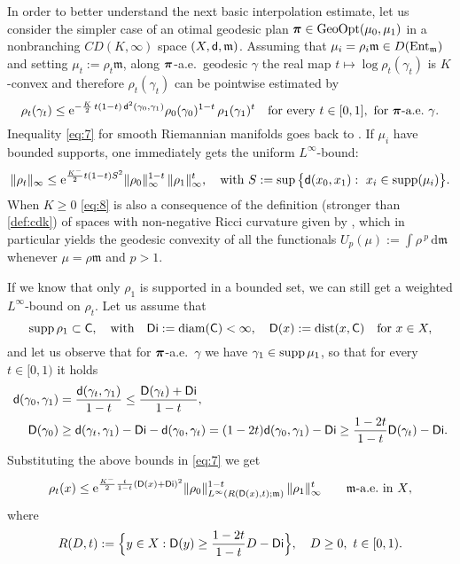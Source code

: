 \documentclass[reqno,11pt]{article}
\numberwithin{equation}{section}
\newcommand{\mm}{{\mbox{\boldmath$m$}}}
\newcommand{\ppi}{{\mbox{\boldmath$\pi$}}}
\newcommand{\sfd}{{\sf d}}
\newcommand{\sfC}{{\sf C}}
\newcommand{\sfD}{{\sf D}}
\newcommand{\rme}{{\mathrm e}}
\newcommand{\supp}{\mathop{\rm supp}\nolimits}   %
\newcommand{\diam}{\mathop{\rm diam}\nolimits}   %
\renewcommand{\d}{{\mathrm d}}
\newcommand{\forevery}{\text{for every }}
\newcommand{\entv}{{\rm Ent}_{\mm}}                    %
\newcommand{\gopt}{{\rm{GeoOpt}}}                   %
\newcommand{\Di}{\mathsf{Di}}
\renewcommand{\mm}{\mathfrak m}
\begin{document}
In order to better understand the next basic interpolation estimate,
let us consider the simpler case of an otimal geodesic plan $\ppi\in
\gopt(\mu_0,\mu_1)$ in a nonbranching $CD(K,\infty)$ space
$(X,\sfd,\mm)$. Assuming that $\mu_i=\rho_i\mm\in D(\entv)$ and
setting $\mu_t:=\rho_t\mm$, along $\ppi$-a.e.\ geodesic $\gamma$ the
real map $t\mapsto\log\rho_t(\gamma_t)$ is $K$-convex and therefore
$\rho_t(\gamma_t)$ can be pointwise estimated by \cite[Thm.~30.32,
(30.51)]{Villani09}
\begin{equation}
  \label{eq:7}
  \rho_t(\gamma_t)\le \rme^{-\frac
    K2\,t(1-t)\,\sfd^2(\gamma_0,\gamma_1)}\rho_0(\gamma_0)^{1-t}\,\rho_1(\gamma_1)^t\quad
  \forevery t\in [0,1],\ \text{for $\ppi$-a.e.\ $\gamma$.}
\end{equation}
Inequality \eqref{eq:7} for smooth Riemannian manifolds goes back to
\cite{Cordero-McCann-Schmuckenschlager01}. If $\mu_i$ have bounded
supports, one immediately gets the uniform $L^\infty$-bound:
\begin{equation}
  \label{eq:8}
  \|\rho_t\|_\infty
  \le \rme^{\frac {K^-}2    t(1-t)S^2}
  \|\rho_0\|_\infty
  ^{1-t}\,\|\rho_1\|_\infty^t,\quad\text{with }
  S:=\sup\big\{\sfd(x_0,x_1):\ x_i\in\supp(\mu_i)\big\}.
\end{equation}
When $K\ge0$ \eqref{eq:8} is also a consequence of the definition (stronger than
\eqref{def:cdk}) of spaces with
non-negative Ricci curvature given by \cite{Lott-Villani09}, which in
particular yields the geodesic convexity of all the
functionals $U_{p}(\mu):=\int \rho\,^p\,\d\mm$ whenever $\mu=\rho\mm$
and $p>1$.

If we know that only $\rho_1$ is supported in a bounded set, we can
still get a weighted $L^\infty$-bound on $\rho_t$. Let us assume
that
\begin{equation}
  \label{eq:9}
  \supp\rho_1\subset \sfC,\quad\text{with}\quad
  \Di:=\diam(\sfC)<\infty,\quad
  \sfD(x):=\mathrm{dist}(x,\sfC)\quad\text{for }x\in X,
\end{equation}
and let us observe that for $\ppi$-a.e.~$\gamma$ we have
$\gamma_1\in\supp\mu_1$, so that for every $t\in [0,1)$ it holds
\begin{align}
\label{eq:10}
\sfd(\gamma_0,\gamma_1)&=\frac{\sfd(\gamma_t,\gamma_1)}{1-t}\leq\frac{\sfD(\gamma_t)+{\sf
Di}}{1-t},
\\
\label{eq:11}
\sfD(\gamma_0)&\geq \sfd(\gamma_t,\gamma_1)-{\sf
Di}-\sfd(\gamma_0,\gamma_t)= (1-2t)\sfd(\gamma_0,\gamma_1)-{\sf
Di}\geq\frac{1-2t}{1-t}\sfD(\gamma_t)-{\sf Di}.
\end{align}
Substituting the above bounds in \eqref{eq:7} we get
\begin{equation}
\label{eq:boundinterpolate} \rho_t(x)\leq
\rme^{\frac{K^-}2\frac{t}{1-t}(\sfD(x)+{\sf Di})^2}
\|\rho_0\|^{1-t}_{L^\infty(R(\sfD(x),t);\mm)}\, \|\rho_1\|^t_\infty
\qquad\text{$\mm$-a.e.~in $X$},
\end{equation}
where
\begin{equation}\label{eq:defM}
R(D,t):= \Big\{y\in X:\sfD(y)\ge \frac{1-2t}{1-t}D-\Di\Big\},\quad
D\ge 0,\ t\in [0,1).
\end{equation}
\end{document}
